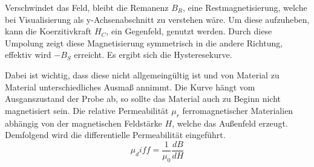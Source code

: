 Verschwindet das Feld, bleibt die Remanenz $B_R$, eine Restmagnetisierung, welche 
bei Visualisierung als y-Achsenabschnitt zu verstehen wäre. Um diese aufzuheben,
kann die Koerzitivkraft $H_C$, ein Gegenfeld, genutzt werden. Durch diese Umpolung 
zeigt diese Magnetisierung symmetrisch in die andere Richtung, effektiv wird 
$-B_S$ erreicht. Es ergibt sich die Hysteresekurve.

Dabei ist wichtig, dass diese nicht allgemeingültig ist und von Material zu 
Material unterschiedliches Ausmaß annimmt. Die Kurve hängt vom Ausganszustand
der Probe ab, so sollte das Material auch zu Beginn nicht magnetisiert sein.
Die relative Permeabilität $\mu_r$ ferromagnetischer Materialien abhängig von 
der magnetischen Feldstärke $H$, welche das Außenfeld erzeugt. Demfolgend wird 
die differentielle Permeabilität eingeführt.
\begin{equation}
    \mu_diff = \frac{1}{\mu_0} \frac{dB}{dH}
\end{equation}

